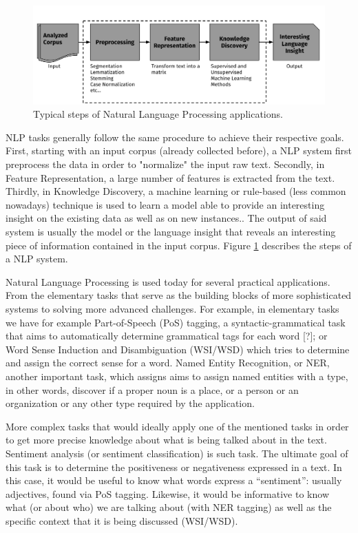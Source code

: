 %
\begin{figure}
\centering
\includegraphics[width=1\linewidth]{./images/Chapitre1/nlp_flow.pdf}
\caption{Typical steps of Natural Language Processing applications.}
\label{fig:nlpflow}
\end{figure}
NLP tasks generally follow the same procedure to achieve their respective goals. First, starting with an input corpus (already collected before), a NLP system first preprocess the data in order to "normalize" the input raw text. Secondly, in Feature Representation, a large number of features is extracted from the text. Thirdly, in Knowledge Discovery,  a machine learning or rule-based (less common nowadays) technique is used to  learn a model able to provide an interesting insight on the existing data as well as on new instances.. The output of said system is usually the model or the language insight that reveals an interesting piece of information contained in the input corpus. Figure \ref{fig:nlpflow} describes the steps of a NLP system. 

Natural Language Processing is used today for several practical applications. From the elementary tasks that serve as the building blocks of more sophisticated systems to solving more advanced challenges. For example, in elementary tasks we have for example Part-of-Speech (PoS) tagging, a syntactic-grammatical task that aims to automatically determine grammatical tags for each word [?]; or Word Sense Induction and Disambiguation (WSI/WSD) which tries to determine and assign the correct sense for a word. Named Entity Recognition, or NER, another important task, which assigns aims to assign named entities with a type, in other words, discover if a proper noun is a place, or a person or an organization or any other type required by the application. 

More complex tasks that would ideally apply one of the mentioned tasks in order to get more precise knowledge about what is being talked about in the text. Sentiment analysis (or sentiment classification) is such task. The ultimate goal of this task is to determine the positiveness or negativeness expressed in a text. In this case, it would be useful to know what words express a ``sentiment'': usually adjectives, found via PoS tagging. Likewise, it would be informative to know what (or about who) we are talking about (with NER tagging) as well as the specific context that it is being discussed (WSI/WSD). 



